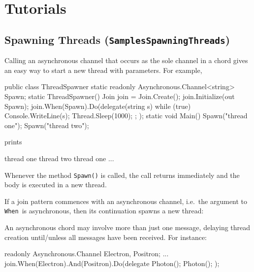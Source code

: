 \documentclass{article}
\newcommand{\sample}[1]{\texorpdfstring{{(\texttt{Samples{\symbol{92}}#1})}}{}}
\newcommand{\mwhen}{{\texttt{When}}}
\begin{document}
\section{Tutorials}\label{tutorials}

\subsection{Spawning Threads \sample{SpawningThreads}}

Calling an asynchronous channel that
occurs as the sole channel in a chord gives an easy way to start a new thread
with parameters. For example,
\begin{lstcsharp}
public class ThreadSpawner {
  static readonly Asynchronous.Channel<string> Spawn;
  static ThreadSpawner() {
    Join join = Join.Create();
    join.Initialize(out Spawn);
    join.When(Spawn).Do(delegate(string s) {
      while (true) {
        Console.WriteLine(s);
        Thread.Sleep(1000);
      };
    });
  }
  static void Main() {
    Spawn("thread one");
    Spawn("thread two");
  }
}
\end{lstcsharp}
prints
\begin{lstcsharp}
thread one
thread two
thread one
...
\end{lstcsharp}

Whenever the method \verb|Spawn()| is called, the call returns immediately
and the body is executed in a new thread.

If a join pattern commences with an asynchronous channel, i.e.\
the argument to \mwhen\ is asynchronous,
then its continuation spawns a new thread:

An asynchronous chord may involve more than just one message, delaying thread creation until/unless all
messages have been received. For instance:

\begin{lstcsharp}
  readonly Asynchronous.Channel Electron, Positron;
  ...
  join.When(Electron).And(Positron).Do(delegate { 
    Photon(); Photon();
  });
\end{lstcsharp}
\end{document}

